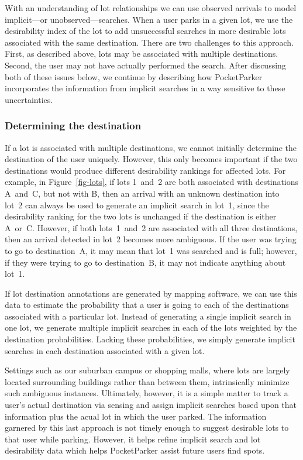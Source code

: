 With an understanding of lot relationships we can use observed arrivals to
model implicit---or unobserved---searches. When a user parks in a given lot,
we use the desirability index of the lot to add unsuccessful searches in more
desirable lots associated with the same destination. There are two challenges
to this approach. First, as described above, lots may be associated with
multiple destinations. Second, the user may not have actually performed the
search. After discussing both of these issues below, we continue by
describing how PocketParker incorporates the information from implicit
searches in a way sensitive to these uncertainties.

\subsubsection{Determining the destination}

If a lot is associated with multiple destinations, we cannot initially
determine the destination of the user uniquely. However, this only becomes
important if the two destinations would produce different desirability
rankings for affected lots. For example, in Figure~\ref{fig-lots}, if lots
1~and~2 are both associated with destinations A~and~C, but not with B, then
an arrival with an unknown destination into lot~2 can always be used to
generate an implicit search in lot~1, since the desirability ranking for the
two lots is unchanged if the destination is either A~or~C. However, if both
lots~1~and~2 are associated with all three destinations, then an arrival
detected in lot~2 becomes more ambiguous. If the user was trying to go to
destination~A, it may mean that lot~1 was searched and is full; however, if
they were trying to go to destination~B, it may not indicate anything about
lot~1.

If lot destination annotations are generated by mapping software, we can use
this data to estimate the probability that a user is going to each of the
destinations associated with a particular lot. Instead of generating a single
implicit search in one lot, we generate multiple implicit searches in each of
the lots weighted by the destination probabilities.  Lacking these
probabilities, we simply generate implicit searches in each destination
associated with a given lot.

Settings such as our suburban campus or shopping malls, where lots
are largely located surrounding buildings rather than between them,
intrinsically minimize such ambiguous instances.  Ultimately, however, it is
a simple matter to track a user's actual destination via sensing and
assign implicit searches based upon that information plus the acual lot in
which the user parked.  The information garnered by this last approach
is not timely enough to suggest desirable lots to that user while parking.
However, it helps refine implicit search and lot desirability data which
helps PocketParker assist future users find spots.


